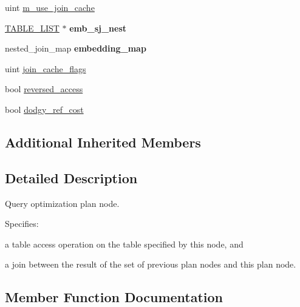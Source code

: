 \begin{DoxyCompactItemize}
\item 
uint \mbox{\hyperlink{classJOIN__TAB_a1ecf65f96da453dc4c0015f603e4c0c4}{m\+\_\+use\+\_\+join\+\_\+cache}}
\item 
\mbox{\label{classJOIN__TAB_a7b591962b90a8753b0f593b7f1839e20}} 
\mbox{\hyperlink{structTABLE__LIST}{T\+A\+B\+L\+E\+\_\+\+L\+I\+ST}} $\ast$ {\bfseries emb\+\_\+sj\+\_\+nest}
\item 
\mbox{\label{classJOIN__TAB_ad853c1b0081fb34965a38e9ca5f03285}} 
nested\+\_\+join\+\_\+map {\bfseries embedding\+\_\+map}
\item 
uint \mbox{\hyperlink{classJOIN__TAB_a959379915961c4b73e69d72cbd09e826}{join\+\_\+cache\+\_\+flags}}
\item 
bool \mbox{\hyperlink{classJOIN__TAB_a7a7e195850769137dccb04fa7b570e38}{reversed\+\_\+access}}
\item 
bool \mbox{\hyperlink{classJOIN__TAB_a9d2ab8a5c5a404cdf8a3a60816ed3ab5}{dodgy\+\_\+ref\+\_\+cost}}
\end{DoxyCompactItemize}
\subsection*{Additional Inherited Members}


\subsection{Detailed Description}
Query optimization plan node.

Specifies\+:


\begin{DoxyItemize}
\item a table access operation on the table specified by this node, and
\item a join between the result of the set of previous plan nodes and this plan node. 
\end{DoxyItemize}

\subsection{Member Function Documentation}
\mbox{\label{classJOIN__TAB_a7134d17d1d7755261a38029d07d98579}} 
